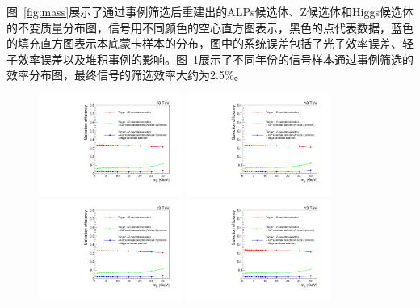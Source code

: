 图~\ref{fig:mass}展示了通过事例筛选后重建出的ALPs候选体、Z候选体和Higgs候选体的不变质量分布图，信号用不同颜色的空心直方图表示，黑色的点代表数据，蓝色的填充直方图表示本底蒙卡样本的分布，图中的系统误差包括了光子效率误差、轻子效率误差以及堆积事例的影响。图~\ref{fig:SelectionEff}展示了不同年份的信号样本通过事例筛选的效率分布图，最终信号的筛选效率大约为2.5\%。

\begin{figure}[htbp]
  \begin{center}
		\includegraphics[width=0.42\textwidth]{figures/chapter04/cuteff_16.pdf}
    \includegraphics[width=0.42\textwidth]{figures/chapter04/cuteff_16APV.pdf} \\
		\includegraphics[width=0.42\textwidth]{figures/chapter04/cuteff_17.pdf}
		\includegraphics[width=0.42\textwidth]{figures/chapter04/cuteff_18.pdf}\\
    \label{fig:SelectionEff}
\end{center}
\end{figure}



